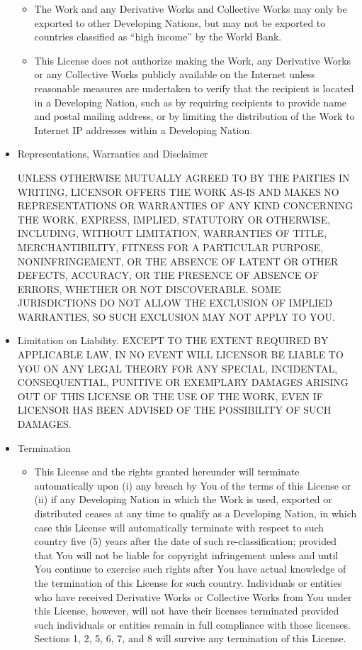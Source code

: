 \documentclass{article}
\begin{document}
\begin{itemize}
\begin{itemize}
\item The Work and any Derivative Works and Collective Works may only
be exported to other Developing Nations, but may not be exported to
countries classified as ``high income'' by the World Bank.

\item This License does not authorize making the Work, any Derivative
Works or any Collective Works publicly available on the Internet
unless reasonable measures are undertaken to verify that the recipient
is located in a Developing Nation, such as by requiring recipients to
provide name and postal mailing address, or by limiting the
distribution of the Work to Internet IP addresses within a Developing
Nation.\end{itemize}

\item Representations, Warranties and Disclaimer

UNLESS OTHERWISE MUTUALLY AGREED TO BY THE PARTIES IN WRITING,
LICENSOR OFFERS THE WORK AS-IS AND MAKES NO REPRESENTATIONS OR
WARRANTIES OF ANY KIND CONCERNING THE WORK, EXPRESS, IMPLIED,
STATUTORY OR OTHERWISE, INCLUDING, WITHOUT LIMITATION, WARRANTIES OF
TITLE, MERCHANTIBILITY, FITNESS FOR A PARTICULAR PURPOSE,
NONINFRINGEMENT, OR THE ABSENCE OF LATENT OR OTHER DEFECTS, ACCURACY,
OR THE PRESENCE OF ABSENCE OF ERRORS, WHETHER OR NOT DISCOVERABLE. 
SOME JURISDICTIONS DO NOT ALLOW THE EXCLUSION OF IMPLIED WARRANTIES,
SO SUCH EXCLUSION MAY NOT APPLY TO YOU.

\item Limitation on Liability.  EXCEPT TO THE EXTENT REQUIRED BY
APPLICABLE LAW, IN NO EVENT WILL LICENSOR BE LIABLE TO YOU ON ANY
LEGAL THEORY FOR ANY SPECIAL, INCIDENTAL, CONSEQUENTIAL, PUNITIVE OR
EXEMPLARY DAMAGES ARISING OUT OF THIS LICENSE OR THE USE OF THE WORK,
EVEN IF LICENSOR HAS BEEN ADVISED OF THE POSSIBILITY OF SUCH DAMAGES.

\item Termination \begin{itemize} \item This License and the rights
granted hereunder will terminate automatically upon (i) any breach by
You of the terms of this License or (ii) if any Developing Nation in
which the Work is used, exported or distributed ceases at any time to
qualify as a Developing Nation, in which case this License will
automatically terminate with respect to such country five (5) years
after the date of such re-classification; provided that You will not
be liable for copyright infringement unless and until You continue to
exercise such rights after You have actual knowledge of the
termination of this License for such country.  Individuals or entities
who have received Derivative Works or Collective Works from You under
this License, however, will not have their licenses terminated
provided such individuals or entities remain in full compliance with
those licenses.  Sections 1, 2, 5, 6, 7, and 8 will survive any
termination of this License.


\end{itemize}
\end{itemize}
\end{document}
